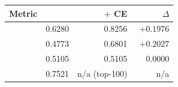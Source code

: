 \begin{tabular}{lrrr}
    \toprule
    Metric & \bmtwofive{} & \bmtwofive{} $+$ CE & $\Delta$ \\
    \midrule
    \mrr{} & 0.6280 & 0.8256 & $\mathbf{+0.1976}$ \\
    \ndcg{} & 0.4773 & 0.6801 & $\mathbf{+0.2027}$ \\
    \recallH{} & 0.5105 & 0.5105 & $\phantom{+}0.0000$ \\
    \recallK{} & 0.7521 & n/a (top-100) & n/a \\
    \bottomrule
\end{tabular}
